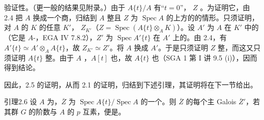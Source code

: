 验证性。（更一般的结果见附录。）由于 $A\{t\}/A$ 有“$t=0$”， $Z$ 。为证明它，由 2.4 把 $A$ 换成一个商，归结到 $A$ 整且 $Z$ 为 $\operatorname{Spec}A$ 的上方的的情形。只须证明，对 $A$ 的 $K$ 的任意 $K'$， $Z_{K'}$（$Z=\operatorname{Spec}(A\{t\}\otimes_A K)$）。设 $A'$ 为 $A$ 在 $K'$ 中的（它是 $A$-，EGA IV 7.8.2），$Z'$ 为 $\operatorname{Spec}A'\{t\}$ 在 $A'$ 上的。由 2.4，有 $A'\{t\}\simeq A'\otimes_A A\{t\}$，故 $Z_{K'}\simeq Z'$。将 $A$ 换成 $A'$。于是只须证明 $Z$ 整，而这又只须证明 $A\{t\}$ 整。由于 $A$ ，$A[t]$ 也，故 $A\{t\}$ 也（SGA 1 第 I 讲 9.5 (i)），因而得到结论。

因此，2.5 的证明，从而 2.1 的证明，归结到下述引理，其证明将在下一节给出。
\begin{SGAresult}{引理}{2.6}
设 $A$ 为，$\overline Z$ 为 $\operatorname{Spec}A\{t\}/\operatorname{Spec}A$ 的一个。则 $\overline Z$ 的每个主 Galois  $\overline Z'$，若其群 $G$ 的阶数与 $A$ 的 $p$ 互素，便是。
\end{SGAresult}

